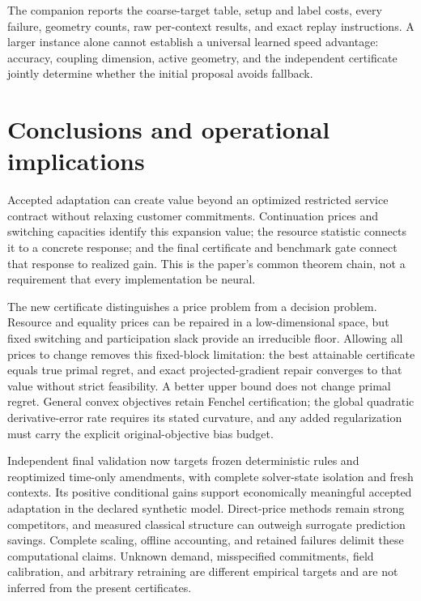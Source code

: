 \documentclass[11pt,letterpaper]{article}
\theoremstyle{definition}
\newcommand{\1}{\mathbf 1}
\begin{document}

The companion reports the coarse-target table, setup and label costs, every failure, geometry counts, raw per-context results, and exact replay instructions. A larger instance alone cannot establish a universal learned speed advantage: accuracy, coupling dimension, active geometry, and the independent certificate jointly determine whether the initial proposal avoids fallback.



\section{Conclusions and operational implications}
Accepted adaptation can create value beyond an optimized restricted service contract without relaxing customer commitments. Continuation prices and switching capacities identify this expansion value; the resource statistic connects it to a concrete response; and the final certificate and benchmark gate connect that response to realized gain. This is the paper's common theorem chain, not a requirement that every implementation be neural.

The new certificate distinguishes a price problem from a decision problem. Resource and equality prices can be repaired in a low-dimensional space, but fixed switching and participation slack provide an irreducible floor. Allowing all prices to change removes this fixed-block limitation: the best attainable certificate equals true primal regret, and exact projected-gradient repair converges to that value without strict feasibility. A better upper bound does not change primal regret. General convex objectives retain Fenchel certification; the global quadratic derivative-error rate requires its stated curvature, and any added regularization must carry the explicit original-objective bias budget.

Independent final validation now targets frozen deterministic rules and reoptimized time-only amendments, with complete solver-state isolation and fresh contexts. Its positive conditional gains support economically meaningful accepted adaptation in the declared synthetic model. Direct-price methods remain strong competitors, and measured classical structure can outweigh surrogate prediction savings. Complete scaling, offline accounting, and retained failures delimit these computational claims. Unknown demand, misspecified commitments, field calibration, and arbitrary retraining are different empirical targets and are not inferred from the present certificates.
\end{document}
